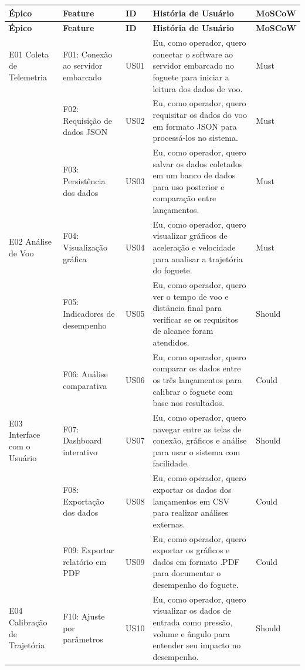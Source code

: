 \begin{longtable}{|>{\centering\arraybackslash}m{2cm}|
                    >{\centering\arraybackslash}m{2.7cm}|
                    >{\centering\arraybackslash}m{1cm}|
                    >{\centering\arraybackslash}m{6cm}|
                    >{\centering\arraybackslash}m{2cm}|}
  \hline
  \textbf{Épico} & \textbf{Feature} & \textbf{ID} & \textbf{História de Usuário} & \textbf{MoSCoW} \\
  \hline
  \endfirsthead
  
  \hline
  \textbf{Épico} & \textbf{Feature} & \textbf{ID} & \textbf{História de Usuário} & \textbf{MoSCoW} \\
  \hline
  \endhead

E01 Coleta de Telemetria
    & F01: Conexão ao servidor embarcado & US01 & Eu, como operador, quero conectar o software ao servidor embarcado no foguete para iniciar a leitura dos dados de voo. & Must \\
  \cline{2-5}
    & F02: Requisição de dados JSON & US02 & Eu, como operador, quero requisitar os dados do voo em formato JSON para processá-los no sistema. & Must \\
  \cline{2-5}
    & F03: Persistência dos dados & US03 & Eu, como operador, quero salvar os dados coletados em um banco de dados para uso posterior e comparação entre lançamentos. & Must \\
  \hline

E02 Análise de Voo
    & F04: Visualização gráfica & US04 & Eu, como operador, quero visualizar gráficos de aceleração e velocidade para analisar a trajetória do foguete. & Must \\
  \cline{2-5}
    & F05: Indicadores de desempenho & US05 & Eu, como operador, quero ver o tempo de voo e distância final para verificar se os requisitos de alcance foram atendidos. & Should \\
  \cline{2-5}
    & F06: Análise comparativa & US06 & Eu, como operador, quero comparar os dados entre os três lançamentos para calibrar o foguete com base nos resultados. & Could \\
  \hline

E03 Interface com o Usuário
    & F07: Dashboard interativo & US07 & Eu, como operador, quero navegar entre as telas de conexão, gráficos e análise para usar o sistema com facilidade. & Should \\
  \cline{2-5}
    & F08: Exportação dos dados & US08 & Eu, como operador, quero exportar os dados dos lançamentos em CSV para realizar análises externas. & Could \\
  \cline{2-5}
    & F09: Exportar relatório em PDF & US09 & Eu, como operador, quero exportar os gráficos e dados em formato .PDF para documentar o desempenho do foguete. & Could \\
  \hline

E04 Calibração de Trajetória
    & F10: Ajuste por parâmetros & US10 & Eu, como operador, quero visualizar os dados de entrada como pressão, volume e ângulo para entender seu impacto no desempenho. & Should \\
  \hline

\end{longtable}



